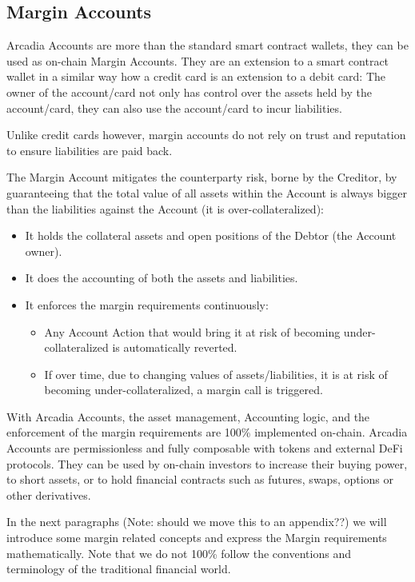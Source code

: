 \documentclass[sigconf,nonacm]{acmart}
\begin{document}
\subsection{Margin Accounts}
\label{subsec:margin-accounts}
Arcadia Accounts are more than the standard smart contract wallets, they can be used as on-chain Margin Accounts.
They are an extension to a smart contract wallet in a similar way how a credit card is an extension to a debit card:
The owner of the account/card not only has control over the assets held by the account/card,
they can also use the account/card to incur liabilities.

Unlike credit cards however, margin accounts do not rely on trust and reputation to ensure liabilities are paid back.

The Margin Account mitigates the counterparty risk, borne by the Creditor,
by guaranteeing that the total value of all assets within the Account is always bigger than the liabilities against the Account (it is over-collateralized):
\begin{itemize}
    \item It holds the collateral assets and open positions of the Debtor (the Account owner).
    \item It does the accounting of both the assets and liabilities.
    \item It enforces the margin requirements continuously:
    \begin{itemize}
        \item Any Account Action that would bring it at risk of becoming under-collateralized is automatically reverted.
        \item If over time, due to changing values of assets/liabilities, it is at risk of becoming under-collateralized, a margin call is triggered.
    \end{itemize}
\end{itemize}

With Arcadia Accounts, the asset management, Accounting logic, and the enforcement of the margin requirements are 100\% implemented on-chain.
Arcadia Accounts are permissionless and fully composable with tokens and external DeFi protocols.
They can be used by on-chain investors to increase their buying power, to short assets, or to hold financial contracts such as futures, swaps, options or other derivatives.

In the next paragraphs (Note: should we move this to an appendix??) we will introduce some margin related concepts and express the Margin requirements mathematically.
Note that we do not 100\% follow the conventions and terminology of the traditional financial world.
\end{document}
